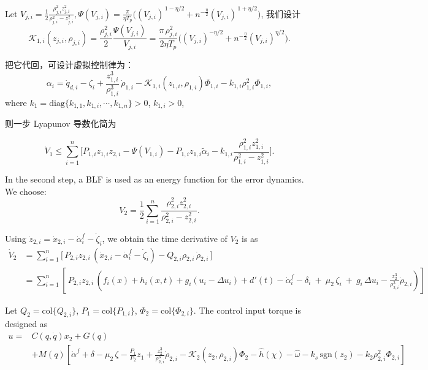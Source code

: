 \documentclass[pdflatex,sn-mathphys-num]{sn-jnl}%
\theoremstyle{thmstyleone}%
\theoremstyle{thmstyletwo}%
\theoremstyle{thmstylethree}%
\begin{document}
Let ${V_{j,i}}=\frac{1}{2}\frac{\rho_{j,i}^2 z_{j,i}^2}{\rho_{j,i}^2-z_{j,i}^2}, \Psi(V_{j,i})=\frac{\pi}{ \eta T_p}\Big((V_{j,i})^{\,1-\eta/2}+n^{-\frac{\eta}{2} }(V_{j,i})^{\,1+\eta/2}\Big)$, 我们设计
$$
\mathcal{K}_{1,i}(z_{j,i},\rho_{j,i})
=\frac{\rho_{j,i}^2}{2}\frac{\Psi(V_{j,i})}{V_{j,i}}
=\frac{\pi\,\rho_{j,i}^2}{2\eta T_p}\Big((V_{j,i})^{-\eta/2}+n^{-\frac{\eta}{2} }(V_{j,i})^{\eta/2}\Big).
$$

把它代回，可设计虚拟控制律为：
\begin{equation}\label{eq:25}
\alpha_i = \dot q_{d,i}-\zeta_i+\frac{z_{1,i}^3}{\rho_{1,i}^3}\,\dot\rho_{1,i}
-\mathcal{K}_{1,i}(z_{1,i},\rho_{1,i})\Phi_{1,i}
-k_{1,i} \rho_{1,i}^2 \Phi_{1,i},
\end{equation}
where $k_1=\mathrm{diag}\{k_{1,1},k_{1,i},\cdots,k_{1,n}\}>0$, $k_{1,i}>0$,

则一步 Lyapunov 导数化简为

$$
\dot V_1
\le \sum_{i=1}^n \Big[ P_{1,i}z_{1,i} z_{2,i}
-\Psi(V_{1,i})-P_{1,i}z_{1,i}\tilde\alpha_i- k_{1,i}\frac{\rho_{1,i}^2 z_{1,i}^2}{\rho_{1,i}^2-z_{1,i}^2} 
\Big].
$$


In the second step, a BLF is used as an energy function for the error dynamics. We choose:
\begin{equation}\label{eq:25}
	V_2= \frac{1}{2}\sum_{i=1}^{n} \frac{\rho_{2,i}^2 z_{2,i}^2}{\rho_{2,i}^2-z_{2,i}^2}. 
\end{equation}


Using $\dot z_{2,i}=\dot x_{2,i}-\dot\alpha_i^{f}-\dot\zeta_i$, we obtain the time derivative of $V_2$ is as
\begin{equation}
	\begin{aligned}
		\dot V_2& = \sum_{i=1}^n \Big[\,P_{2,i}z_{2,i}\,(\dot x_{2,i}-\dot\alpha_i^{f}-\dot\zeta_i)-Q_{2,i}\rho_{2,i}\,\dot\rho_{2,i}\,\Big]\\
		&
		 = \sum_{i=1}^n \left[\,P_{2,i}z_{2,i}\,\left(f_i(x)+h_i(x,t)+g_i(u_i-\Delta u_i)+d'(t)-\dot\alpha_i^{f}-\delta_i\ +\ \mu_2\,\zeta_i\ +\ g_i\,\Delta u_i-\tfrac{z_{2}^{3}}{\rho_{2,i}^{3}}\dot\rho_{2,i} \right)\right]
	\end{aligned}
\end{equation}

Let $Q_2=\mathrm{col}\{Q_{2,i}\}$,
$P_1=\mathrm{col}\{P_{1,i}\}$,
$\Phi_2=\mathrm{col}\{\Phi_{2,i}\}$. The control input torque is designed as
\begin{equation}\label{eq:tau-cmd}
\begin{aligned}
u =&C(q,\dot{q})x_2 + G(q)\\
&+M(q)\left[\dot\alpha^{f}+\delta -\mu_2\,\zeta-\frac{P_1}{P_2}z_1+\tfrac{z_{2}^{3}}{\rho_{2,i}^{3}}\dot\rho_{2,i}-\mathcal{K}_{2}(z_{2},\rho_{2,i}) \Phi_{2}
-\hat{h}(\chi)
-\hat \omega
-k_s\,\mathrm{sgn}(z_{2})-k_{2}\rho_{2,i}^2 \Phi_{2,i}\right]
\end{aligned}
\end{equation}
\end{document}
